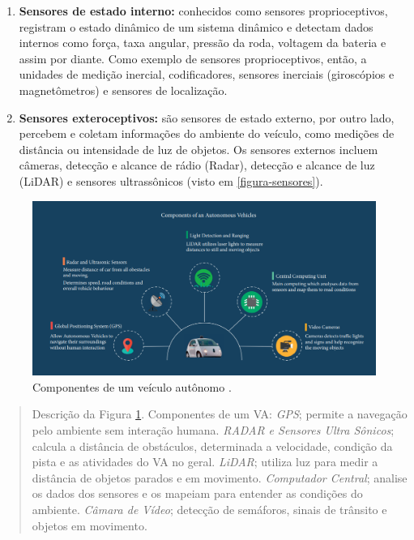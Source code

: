 \begin{enumerate}
 \item \textbf{Sensores de estado interno:} conhecidos como sensores proprioceptivos, registram o estado dinâmico de um sistema dinâmico e detectam dados internos como força, taxa angular, pressão da roda, voltagem da bateria e assim por diante. Como exemplo de sensores proprioceptivos, então, a unidades de medição inercial, codificadores, sensores inerciais (giroscópios e magnetômetros) e sensores de localização. 
\item \textbf{Sensores exteroceptivos:} são sensores de estado externo, por outro lado, percebem e coletam informações do ambiente do veículo, como medições de distância ou intensidade de luz de objetos. Os sensores externos incluem câmeras, detecção e alcance de rádio (Radar), detecção e alcance de luz (LiDAR) e sensores ultrassônicos (visto em \ref{figura-sensores}).

\end{enumerate}



\begin{figure}[H]
\centering
\includegraphics[width=\textwidth]{Figures/compo.png}
\caption{Componentes de um veículo autônomo \cite{aplicacao2}.}
\label{figura_compone}
\end{figure}

\begin{quote}
Descrição da Figura \ref{figura_compone}. Componentes de um VA: \textit{GPS}; permite a navegação pelo ambiente sem interação humana. \textit{RADAR e Sensores Ultra Sônicos}; calcula a distância de obstáculos, determinada a velocidade, condição da pista e as atividades do VA no geral. \textit{LiDAR}; utiliza luz para medir a distância de objetos parados e em movimento. \textit{Computador Central}; analise os dados dos sensores e os mapeiam para entender as condições do ambiente. \textit{Câmara de Vídeo}; detecção de semáforos, sinais de trânsito e objetos em movimento.
\end{quote}


